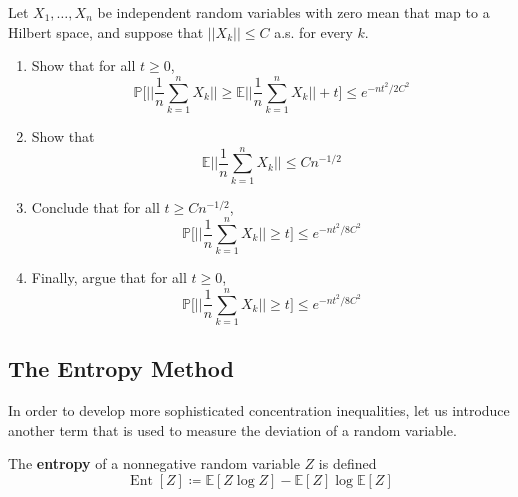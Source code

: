 \documentclass{article}
\DeclareMathOperator{\Ent}{Ent}
\begin{document}
  \begin{exercise}
  Let $X_1, \ldots, X_n$ be independent random variables with zero mean that map to a Hilbert space, and suppose that $||X_k|| \leq C$ a.s. for every $k$. 
  \begin{enumerate}
      \item Show that for all $t \geq 0$, 
      \[\mathbb{P} \bigg[ \bigg| \bigg| \frac{1}{n} \sum_{k=1}^n X_k \bigg| \bigg| \geq \mathbb{E} \bigg| \bigg| \frac{1}{n} \sum_{k=1}^n X_k \bigg| \bigg| + t \bigg] \leq e^{-nt^2 / 2C^2} \]
      
      \item Show that 
      \[\mathbb{E} \bigg| \bigg| \frac{1}{n} \sum_{k=1}^n X_k \bigg| \bigg| \leq C n^{-1/2}\]
      
      \item Conclude that for all $t \geq C n^{-1/2}$, 
      \[\mathbb{P} \bigg[ \bigg| \bigg| \frac{1}{n} \sum_{k=1}^n X_k \bigg| \bigg| \geq t \bigg] \leq e^{-nt^2 / 8C^2}\]
      
      \item Finally, argue that for all $t \geq 0$, 
      \[\mathbb{P} \bigg[ \bigg| \bigg| \frac{1}{n} \sum_{k=1}^n X_k \bigg| \bigg| \geq t \bigg] \leq e^{-nt^2 / 8C^2}\]
  \end{enumerate}
  \end{exercise}

  \subsection{The Entropy Method}

  In order to develop more sophisticated concentration inequalities, let us introduce another term that is used to measure the deviation of a random variable. 

  \begin{definition}[Entropy]
  The \textbf{entropy} of a nonnegative random variable $Z$ is defined 
  \[\Ent[Z] \coloneqq \mathbb{E}[Z \log Z] - \mathbb{E}[Z] \log \mathbb{E}[Z]\]
  \end{definition}
\end{document}
